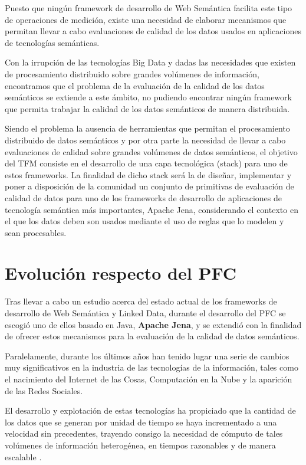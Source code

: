 Puesto que ningún framework de desarrollo de Web Semántica facilita este tipo de
operaciones de medición, existe una necesidad de elaborar
mecanismos que permitan llevar a cabo evaluaciones de calidad de los datos
usados en aplicaciones de tecnologías semánticas.


Con la irrupción de las tecnologías Big Data y dadas las necesidades que existen
de procesamiento distribuido sobre grandes volúmenes de información, encontramos
que el problema de la evaluación de la calidad de los datos semánticos se
extiende a este ámbito, no pudiendo encontrar ningún framework que permita
trabajar la calidad de los datos semánticos de manera distribuida.



Siendo el problema la ausencia de herramientas que permitan el procesamiento
distribuido de datos semánticos y por otra parte la necesidad de llevar a cabo
evaluaciones de calidad sobre grandes volúmenes de datos semánticos, el objetivo del \acf{TFM}
consiste en el desarrollo de una capa tecnológica (stack) para uno de estos frameworks. La finalidad de
dicho stack será la de diseñar, implementar y poner a disposición de la
comunidad un conjunto de primitivas de evaluación de calidad de datos para uno de
los frameworks de desarrollo de aplicaciones de tecnología semántica más
importantes, Apache Jena, considerando el contexto en el que los
datos deben son usados mediante el uso de reglas que lo modelen y sean procesables.


\section{Evolución respecto del PFC}


Tras llevar a cabo un estudio acerca del estado actual de los frameworks de
desarrollo de Web Semántica y Linked Data, durante el desarrollo del \acf{PFC}
se escogió uno de ellos basado en
Java, \textbf{Apache Jena}, y se extendió con la finalidad de ofrecer estos
mecanismos para la evaluación de la calidad de datos semánticos.

Paralelamente, durante los últimos años han tenido lugar una serie de cambios muy
significativos
en la industria de las tecnologías de la información, tales como el nacimiento
del Internet
de las Cosas, Computación en la Nube y la aparición de las Redes Sociales.


El desarrollo y explotación de estas tecnologías ha propiciado que la cantidad
de los datos
que se generan por unidad de tiempo se haya incrementado a una velocidad sin
precedentes,
trayendo consigo la necesidad de cómputo de tales volúmenes de información
heterogénea,
en tiempos razonables y de manera escalable \cite{map_reduce}.


